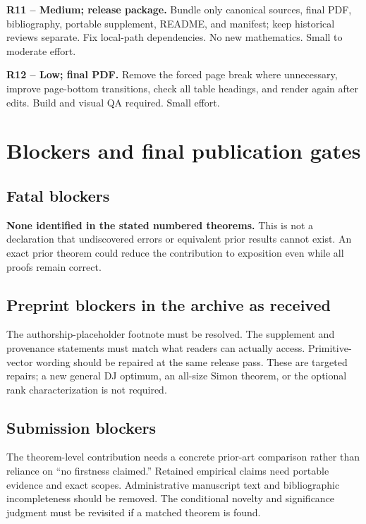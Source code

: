 \documentclass[
  11pt,
]{article}
\begin{document}
\textbf{R11 -- Medium; release package.} Bundle only canonical sources,
final PDF, bibliography, portable supplement, README, and manifest; keep
historical reviews separate. Fix local-path dependencies. No new
mathematics. Small to moderate effort.

\textbf{R12 -- Low; final PDF.} Remove the forced page break where
unnecessary, improve page-bottom transitions, check all table headings,
and render again after edits. Build and visual QA required. Small
effort.

\section{Blockers and final publication
gates}\label{blockers-and-final-publication-gates}

\subsection{Fatal blockers}\label{fatal-blockers}

\textbf{None identified in the stated numbered theorems.} This is not a
declaration that undiscovered errors or equivalent prior results cannot
exist. An exact prior theorem could reduce the contribution to
exposition even while all proofs remain correct.

\subsection{Preprint blockers in the archive as
received}\label{preprint-blockers-in-the-archive-as-received}

The authorship-placeholder footnote must be resolved. The supplement and
provenance statements must match what readers can actually access.
Primitive-vector wording should be repaired at the same release pass.
These are targeted repairs; a new general DJ optimum, an all-size Simon
theorem, or the optional rank characterization is not required.

\subsection{Submission blockers}\label{submission-blockers}

The theorem-level contribution needs a concrete prior-art comparison
rather than reliance on ``no firstness claimed.'' Retained empirical
claims need portable evidence and exact scopes. Administrative
manuscript text and bibliographic incompleteness should be removed. The
conditional novelty and significance judgment must be revisited if a
matched theorem is found.
\end{document}
